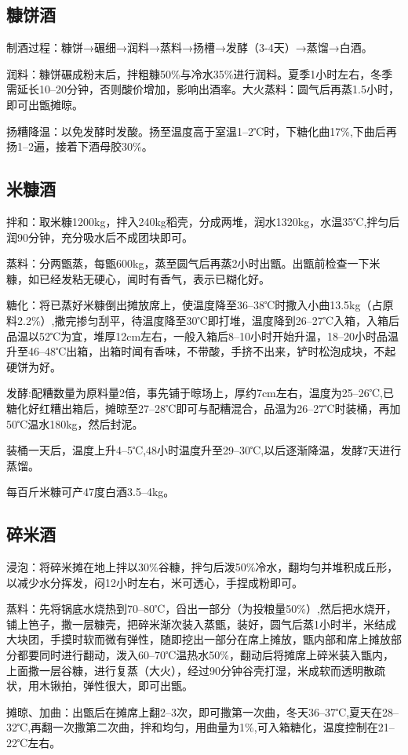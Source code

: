 \documentclass{ctexbook}
\begin{document}
\subsection{糠饼酒}
制酒过程：糠饼→碾细→润料→蒸料→扬槽→发酵（3-4天）→蒸馏→白酒。

润料：糠饼碾成粉末后，拌粗糠50\%与冷水35\%进行润料。夏季1小时左右，冬季需延长10--20分钟，否则酸价增加，影响出酒率。大火蒸料：圆气后再蒸1.5小时，即可出甑摊晾。

扬糟降温：以免发酵时发酸。扬至温度高于室温1--2℃时，下糖化曲17\%,下曲后再扬1--2遍，接着下酒母胶30\%。
\subsection{米糠酒}
拌和：取米糠1200kg，拌入240kg稻壳，分成两堆，润水1320kg，水温35℃,拌匀后润90分钟，充分吸水后不成团块即可。

蒸料：分两甑蒸，每甑600kg，蒸至圆气后再蒸2小时出甑。出甑前检查一下米糠，如已经发粘无硬心，闻时有香气，表示已糊化好。

糖化：将已蒸好米糠倒出摊放席上，使温度降至36--38℃时撒入小曲13.5kg（占原料2.2\%）,撒完掺匀刮平，待温度降至30℃即打堆，温度降到26--27℃入箱，入箱后品温以52℃为宜，堆厚12cm左右，一般入箱后8--10小时开始升温，18--20小时品温升至46--48℃出箱，出箱时闻有香味，不带酸，手挤不出来，铲时松泡成块，不起硬饼为好。

发酵:配糟数量为原料量2倍，事先铺于晾场上，厚约7cm左右，温度为25--26℃,已糖化好红糟出箱后，摊晾至27--28℃即可与配糟混合，品温为26--27℃时装桶，再加50℃温水180kg，然后封泥。

装桶一天后，温度上升4--5℃,48小时温度升至29--30℃,以后逐渐降温，发酵7天进行蒸馏。

每百斤米糠可产47度白酒3.5--4kg。
\subsection{碎米酒}
浸泡：将碎米摊在地上拌以30\%谷糠，拌匀后泼50\%冷水，翻均匀并堆积成丘形，以减少水分挥发，闷12小时左右，米可透心，手捏成粉即可。

蒸料：先将锅底水烧热到70--80℃，舀出一部分（为投粮量50\%）,然后把水烧开，铺上笆子，撒一层糠壳，把碎米渐次装入蒸甑，装好，圆气后蒸1小时半，米结成大块团，手摸时软而微有弹性，随即挖出一部分在席上摊放，甑内部和席上摊放部分都要同时进行翻动，泼入60--70℃温热水50\%，翻动后将摊席上碎米装入甑内，上面撒一层谷糠，进行复蒸（大火），经过90分钟谷壳打湿，米成软而透明散疏状，用木锹拍，弹性很大，即可出甑。

摊晾、加曲：出甑后在摊席上翻2--3次，即可撒第一次曲，冬天36--37℃,夏天在28--32℃,再翻一次撒第二次曲，拌和均匀，用曲量为1\%,可入箱糖化，温度控制在21--22℃左右。
\end{document}
